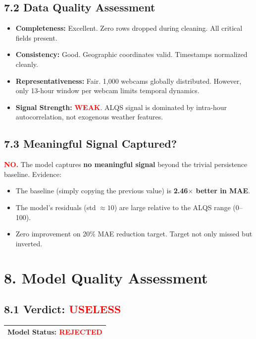 \documentclass[11pt,a4paper]{article}
\begin{document}
\subsection{7.2 Data Quality Assessment}

\begin{itemize}
    \item \textbf{Completeness:} Excellent. Zero rows dropped during cleaning. All critical fields present.
    \item \textbf{Consistency:} Good. Geographic coordinates valid. Timestamps normalized cleanly.
    \item \textbf{Representativeness:} Fair. 1,000 webcams globally distributed. However, only 13-hour window per webcam limits temporal dynamics.
    \item \textbf{Signal Strength:} \textcolor{red}{\textbf{WEAK}}. ALQS signal is dominated by intra-hour autocorrelation, not exogenous weather features.
\end{itemize}

\subsection{7.3 Meaningful Signal Captured?}

\textcolor{red}{\textbf{NO.}} The model captures \textbf{no meaningful signal} beyond the trivial persistence baseline. Evidence:

\begin{itemize}
    \item The baseline (simply copying the previous value) is \textbf{2.46$\times$ better in MAE}.
    \item The model's residuals (std $\approx 10$) are large relative to the ALQS range (0--100).
    \item Zero improvement on 20\% MAE reduction target. Target not only missed but inverted.
\end{itemize}

\section{8. Model Quality Assessment}

\subsection{8.1 Verdict: \textcolor{red}{\textbf{USELESS}}}

\begin{center}
\Large
\begin{tabular}{|c|}
\hline
\textbf{Model Status: } \textcolor{red}{\textbf{REJECTED}} \\
\hline
\end{tabular}
\end{center}
\end{document}

